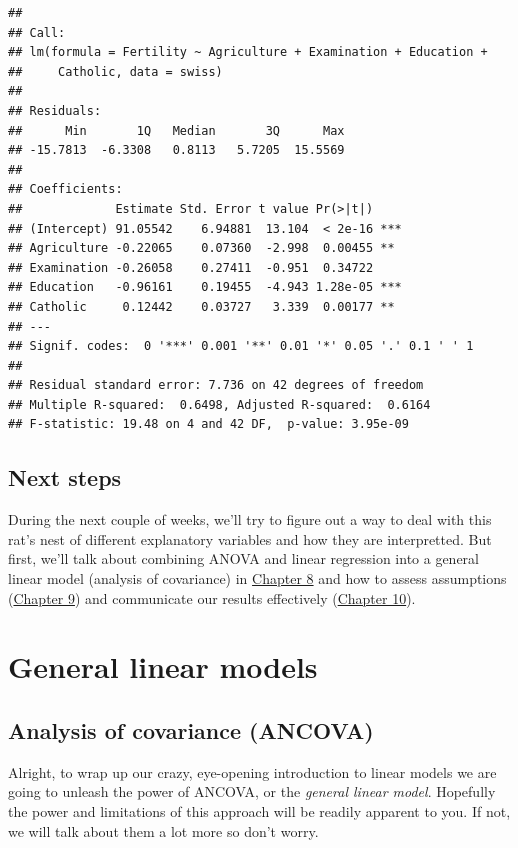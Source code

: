\documentclass[
]{book}
\begin{document}
\begin{verbatim}
## 
## Call:
## lm(formula = Fertility ~ Agriculture + Examination + Education + 
##     Catholic, data = swiss)
## 
## Residuals:
##      Min       1Q   Median       3Q      Max 
## -15.7813  -6.3308   0.8113   5.7205  15.5569 
## 
## Coefficients:
##             Estimate Std. Error t value Pr(>|t|)    
## (Intercept) 91.05542    6.94881  13.104  < 2e-16 ***
## Agriculture -0.22065    0.07360  -2.998  0.00455 ** 
## Examination -0.26058    0.27411  -0.951  0.34722    
## Education   -0.96161    0.19455  -4.943 1.28e-05 ***
## Catholic     0.12442    0.03727   3.339  0.00177 ** 
## ---
## Signif. codes:  0 '***' 0.001 '**' 0.01 '*' 0.05 '.' 0.1 ' ' 1
## 
## Residual standard error: 7.736 on 42 degrees of freedom
## Multiple R-squared:  0.6498,	Adjusted R-squared:  0.6164 
## F-statistic: 19.48 on 4 and 42 DF,  p-value: 3.95e-09
\end{verbatim}

\hypertarget{next7}{%
\section{Next steps}\label{next7}}

During the next couple of weeks, we'll try to figure out a way to deal with this rat's nest of different explanatory variables and how they are interpretted. But first, we'll talk about combining ANOVA and linear regression into a general linear model (analysis of covariance) in \protect\hyperlink{Chapter8}{Chapter 8} and how to assess assumptions (\protect\hyperlink{Chapter9}{Chapter 9}) and communicate our results effectively (\protect\hyperlink{Chapter10}{Chapter 10}).

\hypertarget{Chapter8}{%
\chapter{General linear models}\label{Chapter8}}

\hypertarget{analysis-of-covariance-ancova}{%
\section{Analysis of covariance (ANCOVA)}\label{analysis-of-covariance-ancova}}

Alright, to wrap up our crazy, eye-opening introduction to linear models we are going to unleash the power of ANCOVA, or the \emph{general linear model}. Hopefully the power and limitations of this approach will be readily apparent to you. If not, we will talk about them a lot more so don't worry.
\end{document}
